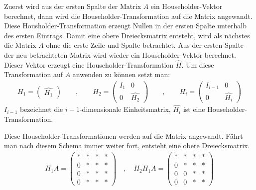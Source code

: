 Zuerst wird aus der ersten Spalte der Matrix $A$ ein Householder-Vektor berechnet, dann wird die Householder-Transformation auf die Matrix angewandt.
Diese Housholder-Transformation erzeugt Nullen in der ersten Spalte unterhalb des ersten Eintrags.
Damit eine obere Dreiecksmatrix entsteht, wird als nächstes die Matrix $A$ ohne die erste Zeile und Spalte betrachtet. Aus der ersten Spalte der neu betrachteten Matrix wird wieder ein Householder-Vektor berechnet.
Dieser Vektor erzeugt eine Householder-Transformation $\hat{H}$.
Um diese Transformation auf $A$ anwenden zu können setzt man:
\begin{align*}
H_1 = \begin{pmatrix}
\hat{H_1} 
\end{pmatrix} \qquad , \qquad
H_2 = \left(\begin{array}{l|l}
I_{1} & 0\\ \hline
0 & \hat{H_2} 	
\end{array} \right)\qquad , \qquad
H_i = \left(\begin{array}{l|l}
I_{i-1} & 0\\ \hline
0 & \hat{H_i} 	
\end{array} \right)
\end{align*}
$I_{i-1}$ bezeichnet die $i-1$-dimensionale Einheitsmatrix, $\hat{H_i}$ ist eine Householder-Transformation.


Diese Householder-Transformationen werden auf die Matrix angewandt.
Fährt man nach diesem Schema immer weiter fort, entsteht eine obere Dreiecksmatrix.
\begin{align*}
	H_1 A= \left( 
	\begin{array}{cccc}
	* & * & * & * \\ 
	0 & * & * & * \\ 
	0 & * & * & * \\ 
	0 & * & * & *
	\end{array}
	\right)
	\quad , \quad
	H_2 H_1 A= \left( 
	\begin{array}{cccc}
	* & * & * & * \\ 
	0 & * & * & * \\ 
	0 & 0 & * & * \\ 
	0 & 0 & * & *
	\end{array}
	\right)
\end{align*} 



